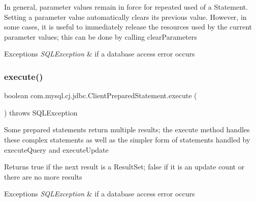 In general, parameter values remain in force for repeated used of a Statement. Setting a parameter value automatically clears its previous value. However, in some cases, it is useful to immediately release the resources used by the current parameter values; this can be done by calling clear\+Parameters


\begin{DoxyExceptions}{Exceptions}
{\em S\+Q\+L\+Exception} & if a database access error occurs \\
\hline
\end{DoxyExceptions}
\mbox{\label{classcom_1_1mysql_1_1cj_1_1jdbc_1_1_client_prepared_statement_aa56b43407e27aeea76e689e2663014e2}} 
\subsubsection{\texorpdfstring{execute()}{execute()}}
{\footnotesize\ttfamily boolean com.\+mysql.\+cj.\+jdbc.\+Client\+Prepared\+Statement.\+execute (\begin{DoxyParamCaption}{ }\end{DoxyParamCaption}) throws S\+Q\+L\+Exception}

Some prepared statements return multiple results; the execute method handles these complex statements as well as the simpler form of statements handled by execute\+Query and execute\+Update

\begin{DoxyReturn}{Returns}
true if the next result is a Result\+Set; false if it is an update count or there are no more results
\end{DoxyReturn}

\begin{DoxyExceptions}{Exceptions}
{\em S\+Q\+L\+Exception} & if a database access error occurs \\
\hline
\end{DoxyExceptions}
\mbox{\label{classcom_1_1mysql_1_1cj_1_1jdbc_1_1_client_prepared_statement_ad47127dbf61bdfd31b8e0230e8421616}} 
